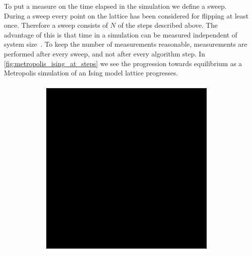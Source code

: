 \documentclass[11pt, a4paper]{report} %
\begin{document}
To put a measure on the time elapsed in the simulation we define a sweep.
During a sweep every point on the lattice has been considered for flipping at least once.
Therefore a sweep consists of \(N\) of the steps described above.
The advantage of this is that time in a simulation can be measured independent of system size~\cite{newman:1999}.
To keep the number of measurements reasonable, measurements are performed after every sweep, and not after every algorithm step.
In \cref{fig:metropolis_ising_at_steps} we see the progression towards equilibrium as a Metropolis simulation of an Ising model lattice progresses.

\begin{figure}[htb]
	\centering
	\begin{subfigure}[c]{0.2\linewidth}
		\includegraphics[width=\linewidth]{20160603124433_40_by_40_Lattice_step0.pdf}
	\end{subfigure}
	~
	\begin{subfigure}[c]{0.2\linewidth}

\end{subfigure}
\end{figure}
\end{document}
